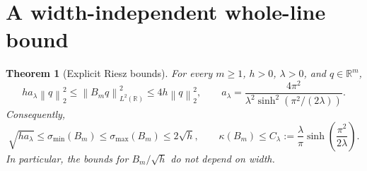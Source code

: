 \documentclass[11pt]{article}
\newtheorem{theorem}{Theorem}
\theoremstyle{remark}
\newcommand{\R}{\mathbb R}
\newcommand{\norm}[1]{\left\lVert #1\right\rVert}
\begin{document}
\section{A width-independent whole-line bound}

\begin{theorem}[Explicit Riesz bounds]\label{thm:riesz}
For every $m\ge1$, $h>0$, $\lambda>0$, and $q\in\R^m$,
\begin{equation}\label{eq:riesz}
 h a_\lambda\norm{q}_2^2
 \le \norm{B_mq}_{L^2(\R)}^2
 \le 4h\norm{q}_2^2,
 \qquad
 a_\lambda=\frac{4\pi^2}
 {\lambda^2\sinh^2(\pi^2/(2\lambda))}.
\end{equation}
Consequently,
\begin{equation}\label{eq:C}
 \sqrt{h a_\lambda}\le \sigma_{\min}(B_m)
 \le \sigma_{\max}(B_m)\le2\sqrt h,
 \qquad
 \kappa(B_m)\le C_\lambda
 :=\frac{\lambda}{\pi}\sinh\!\left(\frac{\pi^2}{2\lambda}\right).
\end{equation}
In particular, the bounds for $B_m/\sqrt h$ do not depend on width.
\end{theorem}
\end{document}
